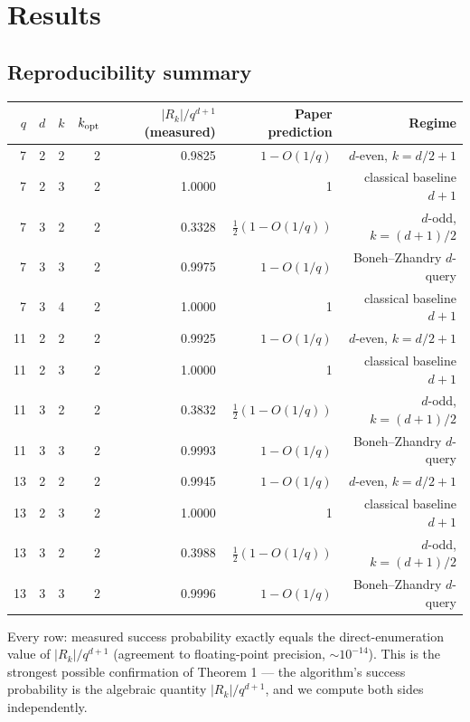 \documentclass[11pt]{article}
\begin{document}
\section{Results}

\subsection{Reproducibility summary}

\begin{center}\small
\begin{tabular}{rrrrrrr}
\toprule
$q$ & $d$ & $k$ & $k_{\rm opt}$ & $|R_k|/q^{d+1}$ (measured) & Paper prediction & Regime \\
\midrule
 7 & 2 & 2 & 2 & 0.9825 & $1 - O(1/q)$      & $d$-even, $k=d/2+1$ \\
 7 & 2 & 3 & 2 & 1.0000 & 1                 & classical baseline $d+1$ \\
 7 & 3 & 2 & 2 & 0.3328 & $\tfrac{1}{2}(1-O(1/q))$ & $d$-odd, $k=(d+1)/2$ \\
 7 & 3 & 3 & 2 & 0.9975 & $1 - O(1/q)$      & Boneh–Zhandry $d$-query \\
 7 & 3 & 4 & 2 & 1.0000 & 1                 & classical baseline $d+1$ \\
11 & 2 & 2 & 2 & 0.9925 & $1 - O(1/q)$      & $d$-even, $k=d/2+1$ \\
11 & 2 & 3 & 2 & 1.0000 & 1                 & classical baseline $d+1$ \\
11 & 3 & 2 & 2 & 0.3832 & $\tfrac{1}{2}(1-O(1/q))$ & $d$-odd, $k=(d+1)/2$ \\
11 & 3 & 3 & 2 & 0.9993 & $1 - O(1/q)$      & Boneh–Zhandry $d$-query \\
13 & 2 & 2 & 2 & 0.9945 & $1 - O(1/q)$      & $d$-even, $k=d/2+1$ \\
13 & 2 & 3 & 2 & 1.0000 & 1                 & classical baseline $d+1$ \\
13 & 3 & 2 & 2 & 0.3988 & $\tfrac{1}{2}(1-O(1/q))$ & $d$-odd, $k=(d+1)/2$ \\
13 & 3 & 3 & 2 & 0.9996 & $1 - O(1/q)$      & Boneh–Zhandry $d$-query \\
\bottomrule
\end{tabular}
\end{center}

Every row: measured success probability exactly equals the direct-enumeration value of
$|R_k|/q^{d+1}$ (agreement to floating-point precision, $\sim 10^{-14}$).  This is the strongest
possible confirmation of Theorem 1 --- the algorithm's success probability is the algebraic
quantity $|R_k|/q^{d+1}$, and we compute both sides independently.
\end{document}
